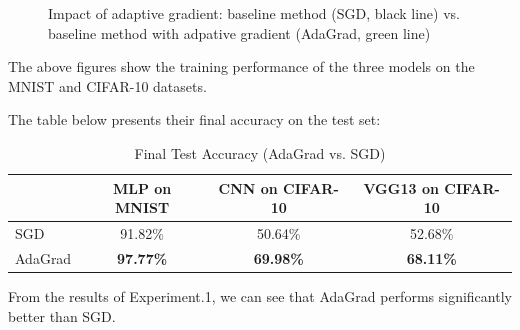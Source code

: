 \documentclass[12pt]{article}
\begin{document}
\begin{figure}[htbp]
     \quad
    \caption{Impact of adaptive gradient: baseline method (SGD, black line) vs. baseline method with adpative gradient (AdaGrad, green line)}
    \label{fig:performance_comparison}
\end{figure}

The above figures show the training performance of the three models on the MNIST and CIFAR-10 datasets. 

The table below presents their final accuracy on the test set:


\begin{table}[H]
\centering
\caption{Final Test Accuracy (AdaGrad vs. SGD)}
\label{tab:final_accuracy_transposed}
\begin{tabular}{|l|c|c|c|}
\hline
        & MLP on MNIST & CNN on CIFAR-10 & VGG13 on CIFAR-10 \\ \hline
SGD     & 91.82\%      & 50.64\%         & 52.68\%           \\ \hline
AdaGrad & \textbf{97.77\%} & \textbf{69.98\%}  & \textbf{68.11\%}    \\ \hline
\end{tabular}
\end{table}

From the results of Experiment.1, we can see that AdaGrad performs significantly better than SGD.
\end{document}
